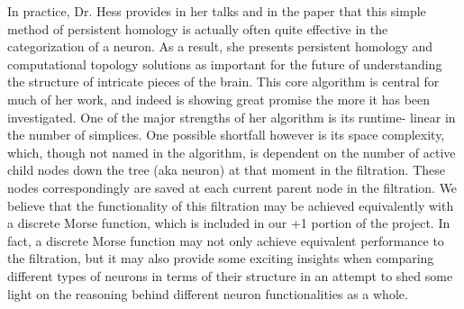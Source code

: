 \documentclass[11pt]{article}
\begin{document}
 In practice, Dr. Hess provides in her talks and in the paper that this simple method of persistent homology is actually often quite effective in the categorization of a neuron.
 As a result, she presents persistent homology and computational topology solutions as important for the future of understanding the structure of intricate pieces of the brain.
 This core algorithm is central for much of her work, and indeed is showing great promise the more it has been investigated. One of the major strengths of her algorithm is its runtime-
 linear in the number of simplices. One possible shortfall however is its space complexity, which, though not named in the algorithm, is dependent on the number of active child nodes down the tree
 (aka neuron) at that moment in the filtration. These nodes correspondingly are saved at each current parent node in the filtration. We believe that the functionality of this filtration may be
 achieved equivalently with a discrete Morse function, which is included in our +1 portion of the project. In fact, a discrete Morse function may not only achieve equivalent performance to the filtration,
 but it may also provide some exciting insights when comparing different types of neurons in terms of their structure in an attempt to shed some light on the reasoning behind different neuron functionalities as
 a whole.
\end{document}
